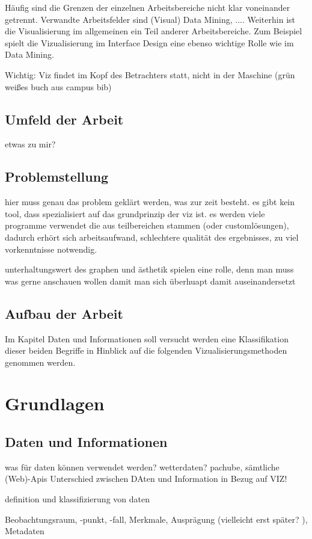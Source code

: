 \documentclass[a4paper, 12pt, onepage, pdftex, headsepline, footsepline]{scrreprt}
\begin{document}
Häufig sind die Grenzen der einzelnen Arbeitsbereiche nicht klar voneinander getrennt. Verwandte Arbeitsfelder sind (Visual) Data Mining, ....
Weiterhin ist die Visualisierung im allgemeinen ein Teil anderer Arbeitsbereiche. Zum Beispiel spielt die Vizualisierung im Interface Design eine ebenso wichtige Rolle wie im Data Mining. 

Wichtig: Viz findet im Kopf des Betrachters statt, nicht in der Maschine (grün weißes buch aus campus bib)


\section{Umfeld der Arbeit}
etwas zu mir?
\section{Problemstellung}
hier muss genau das problem geklärt werden, was zur zeit besteht.
es gibt kein tool, dass spezialisiert auf das grundprinzip der viz ist.
es werden viele programme verwendet die aus teilbereichen stammen (oder customlösungen), dadurch erhört sich arbeitsaufwand, schlechtere qualität des ergebnisses, zu viel vorkenntnisse notwendig.

unterhaltungswert des graphen und ästhetik spielen eine rolle, denn man muss was gerne anschauen wollen damit man sich überhuapt damit auseinandersetzt


\section{Aufbau der Arbeit}
Im Kapitel Daten und Informationen soll versucht werden eine Klassifikation dieser beiden Begriffe in Hinblick auf die folgenden Vizualisierungsmethoden genommen werden.
\chapter{Grundlagen}
\section{Daten und Informationen}
was für daten können verwendet werden? wetterdaten? pachube, sämtliche (Web)-Apis
Unterschied zwischen DAten und Information in Bezug auf VIZ!

definition und klassifizierung von daten

Beobachtungsraum, -punkt, -fall, Merkmale, Ausprägung (vielleicht erst später? ), Metadaten
\end{document}
